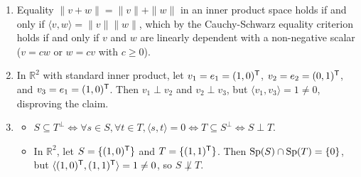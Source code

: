 \begin{exercisesolution}
\label{sol:orthogonality_unitary_true_false}
\begin{enumerate}[label=\textbf{(\alph*)}]
    \item Equality $\|v + w\| = \|v\| + \|w\|$ in an inner product space holds if and only if $\langle v, w \rangle = \|v\| \|w\|$, which by the Cauchy-Schwarz equality criterion holds if and only if $v$ and $w$ are linearly dependent with a non-negative scalar ($v = c w$ or $w = c v$ with $c \ge 0$).

    \item In $\mathbb{R}^2$ with standard inner product, let $v_1 = e_1 = (1, 0)^{\mathsf{T}}$, $v_2 = e_2 = (0, 1)^{\mathsf{T}}$, and $v_3 = e_1 = (1, 0)^{\mathsf{T}}$.
    Then $v_1 \perp v_2$ and $v_2 \perp v_3$, but $\langle v_1, v_3 \rangle = 1 \ne 0$, disproving the claim.

    \item \begin{itemize}
        \item $S \subseteq T^\perp \iff \forall s \in S, \forall t \in T, \langle s, t \rangle = 0 \iff T \subseteq S^\perp \iff S \perp T$.
        \item In $\mathbb{R}^2$, let $S = \{(1, 0)^{\mathsf{T}}\}$ and $T = \{(1, 1)^{\mathsf{T}}\}$.
        Then $\operatorname{Sp}(S) \cap \operatorname{Sp}(T) = \{0\}$, but $\langle (1, 0)^{\mathsf{T}}, (1, 1)^{\mathsf{T}} \rangle = 1 \ne 0$, so $S \not\perp T$.
    \end{itemize}


\end{enumerate}
\end{exercisesolution}
